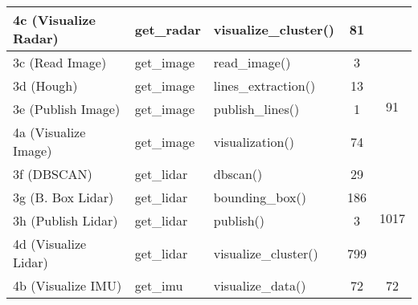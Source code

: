 \begin{table}[H]
\begin{tabular}{l l l c c }
		4c (Visualize Radar) & get\_radar &visualize\_cluster()&81&	\\
		\midrule
		3c (Read Image)      & get\_image & read\_image()		&3&\multirow{4}{*}{91}	\\	
		3d (Hough)             & get\_image & lines\_extraction()&13&	\\
		3e (Publish Image)   & get\_image & publish\_lines() 	&1&	\\
		4a (Visualize Image) & get\_image & visualization()	&74&	\\
		\midrule	
		3f (DBSCAN)            & get\_lidar & dbscan()			&29& \multirow{4}{*}{1017}	\\
		3g (B. Box Lidar)& get\_lidar & bounding\_box()	&186&	\\
		3h (Publish Lidar)   & get\_lidar & publish()			&3&	\\
		4d (Visualize Lidar) & get\_lidar & visualize\_cluster()&799&	\\
		\midrule
		4b (Visualize IMU)   & get\_imu   & visualize\_data()	&72& \multirow{1}{*}{72}	\\	

	
		
	\end{tabular}
	\label{tab_abb}
\end{table}
